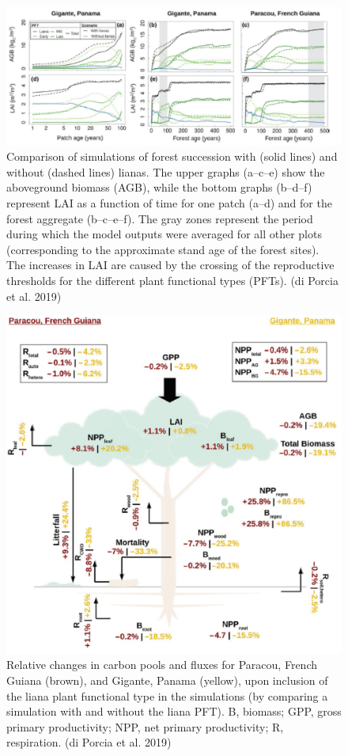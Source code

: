 \documentclass[12pt,oneside]{book}
\begin{document}
\begin{figure}

{\centering \includegraphics[width=0.8\linewidth]{figures/chap7/f724_porcia3} 

}

\caption{Comparison of simulations of forest succession with (solid lines) and without (dashed lines) lianas. The upper graphs (a–c–e) show the aboveground biomass (AGB), while the bottom graphs (b–d–f) represent LAI as a function of time for one patch (a–d) and for the forest aggregate (b–c–e–f). The gray zones represent the period during which the model outputs were averaged for all other plots (corresponding to the approximate stand age of the forest sites). The increases in LAI are caused by the crossing of the reproductive thresholds for the different plant functional types (PFTs). (di Porcia et al. 2019)}\label{fig:f724}
\end{figure}

\begin{figure}

{\centering \includegraphics[width=0.8\linewidth]{figures/chap7/f725_porcia4} 

}

\caption{Relative changes in carbon pools and fluxes for Paracou, French Guiana (brown), and Gigante, Panama (yellow), upon inclusion of the liana plant functional type in the simulations (by comparing a simulation with and without the liana PFT). B, biomass; GPP, gross primary productivity; NPP, net primary productivity; R, respiration. (di Porcia et al. 2019)}\label{fig:f725}
\end{figure}
\end{document}
